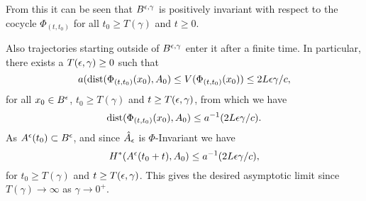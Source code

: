 \begin{prf}
From this it can be seen that $B^{\epsilon, \gamma}$ is positively invariant with
respect to the cocycle $\Phi_{(t,t_0)}$ for all $t_0 \geq T(\gamma)$ and
$t \geq 0$.

Also trajectories starting outside of $B^{\epsilon, \gamma}$ enter it after a
finite time. In particular, there exists a $T(\epsilon, \gamma) \geq 0$
such that
\[ a({\rm dist}(\Phi_{(t,t_0)}(x_0), A_0) \leq V(\Phi_{(t,t_0)}(x_0)) \leq 2L
        \epsilon \gamma /c, \]
for all $x_0 \in B^{\epsilon}$, $t_0 \geq T(\gamma)$ and $t \geq T(\epsilon,
\gamma)$, from which we have
\[ {\rm dist}(\Phi_{(t,t_0)}(x_0), A_0) \leq a^{-1}(2L \epsilon \gamma /c). \]
As $A^{\epsilon}(t_0) \subset B^{\epsilon}$, and since $\hat{A}_{\epsilon}$ is
$\Phi$-Invariant we have
\[ H^*(A^{\epsilon}(t_0 + t),A_0) \leq a^{-1}(2L \epsilon \gamma /c), \]
for $t_0 \geq T(\gamma)$ and $t \geq T(\epsilon, \gamma)$. This gives the
desired asymptotic limit since $T(\gamma) \rightarrow \infty$ as $\gamma
\rightarrow 0^+$.

\end{prf}

\endinput
